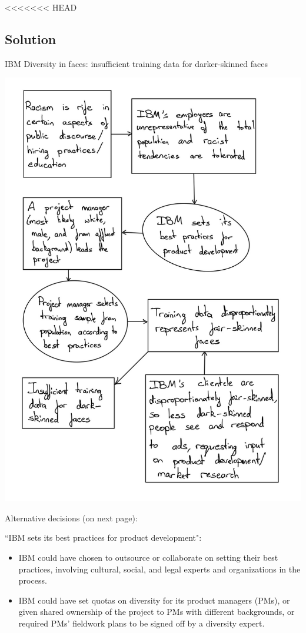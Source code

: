 \documentclass[submit]{harvardml}
\begin{document}
<<<<<<< HEAD
\subsection*{Solution}
IBM Diversity in faces: insufficient training data for darker-skinned faces
\begin{center}
    \includegraphics[scale=0.25]{HW4/3.png}
\end{center}

Alternative decisions (on next page):

``IBM sets its best practices for product development":
\begin{itemize}
  \item IBM could have chosen to outsource or collaborate on setting their best practices, involving cultural, social, and legal experts and organizations in the process.
  \item IBM could have set quotas on diversity for its product managers (PMs), or given shared ownership of the project to PMs with different backgrounds, or required PMs' fieldwork plans to be signed off by a diversity expert.
\end{itemize}
\end{document}
